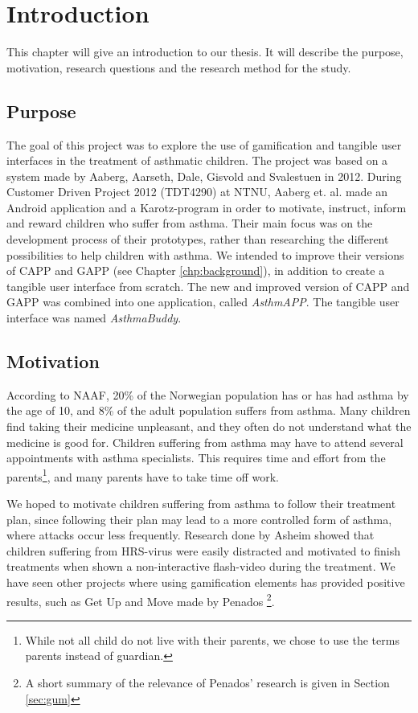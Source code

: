 \chapter{Introduction}
\label{chp:introduction}

This chapter will give an introduction to our thesis. It will describe the purpose, motivation, research questions and the research method for the study. 

\section{Purpose}
\label{sec:purpose}
The goal of this project was to explore the use of gamification and tangible user interfaces in the treatment of asthmatic children. The project was based on a system made by Aaberg, Aarseth, Dale, Gisvold and Svalestuen in 2012\cite{CustomerDriven}. During Customer Driven Project 2012 (TDT4290) at NTNU, Aaberg et. al. made an Android application and a Karotz-program in order to motivate, instruct, inform and reward children who suffer from asthma. Their main focus was on the development process of their prototypes, rather than researching the different possibilities to help children with asthma.
We intended to improve their versions of CAPP and GAPP (see Chapter \ref{chp:background}), in addition to create a tangible user interface from scratch. The new and improved version of CAPP and GAPP was combined into one application, called \emph{AsthmAPP}. The tangible user interface was named \emph{AsthmaBuddy}.  
 

\section{Motivation}
\label{sec:motivation}

According to NAAF, 20\% of the Norwegian population has or has had asthma by the age of 10, and 8\% of the adult population suffers from asthma\cite{NAAFStat}. Many children find taking their medicine unpleasant, and they often do not understand what the medicine is good for. Children suffering from asthma may have to attend several appointments with asthma specialists. This requires time and effort from the parents\footnote{While not all child do not live with their parents, we chose to use the terms parents instead of guardian.}, and many parents have to take time off work. 

We hoped to motivate children suffering from asthma to follow their treatment plan, since following their plan may lead to a more controlled form of asthma, where attacks occur less frequently\cite{ginasthma}. 
Research done by Asheim showed that children suffering from HRS-virus were easily distracted and motivated to finish treatments when shown a non-interactive flash-video during the treatment\cite{asheim2012konsept}. We have seen other projects where using gamification elements has provided positive results, such as Get Up and Move made by Penados \etal{}\cite{penadosget}\footnote{A short summary of the relevance of Penados' research is given in Section \ref{sec:gum}}. 


